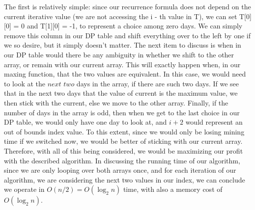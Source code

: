\begin{solution}
    The first is relatively simple: since our recurrence formula does not depend on the current iterative value (we are not accessing the i - th value in T), we can set T[0][0] = 0 and T[1][0] = -1, to represent a choice among zero days. We can simply remove this column in our DP table and shift everything over to the left by one if we so desire, but it simply doesn't matter. The next item to discuss is when in our DP table would there be any ambiguity in whether we shift to the other array, or remain with our current array. This will exactly happen when, in our maxing function, that the two values are equivalent. In this case, we would need to look at the $\textit{next two}$ days in the array, if there are such two days. If we see that in the next two days that the value of current is the maximum value, we then stick with the current, else we move to the other array. Finally, if the number of days in the array is odd, then when we get to the last choice in our DP table, we would only have one day to look at, and $i+2$ would represent an out of bounds index value. To this extent, since we would only be losing mining time if we switched now, we would be better of sticking with our current array. Therefore, with all of this being considered, we would be maximizing our profit with the described algorithm. In discussing the running time of our algorithm, since we are only looping over both arrays once, and for each iteration of our algorithm, we are considering the next two values in our index, we can conclude we operate in $O(n/2) = O(\log_2 n)$ time, with also a memory cost of $O(\log_2 n)$. 
    
\end{solution}

\newpage
